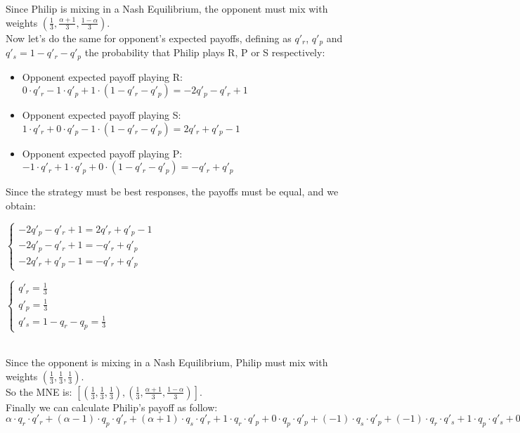 \documentclass[11pt]{article}
\begin{document}
Since Philip is mixing in a Nash Equilibrium, the opponent must mix with weights \(\left(\frac{1}{3},\frac{\alpha + 1}{3},\frac{1 - \alpha}{3}\right) \).\\
Now let's do the same for opponent's expected payoffs, defining as $q'_r$, $q'_p$ and $q'_s = 1 - q'_r - q'_p$ the probability that Philip plays R, P or S respectively:
\begin{itemize}
	\item Opponent expected payoff playing R: $0 \cdot q'_r - 1 \cdot q'_p + 1 \cdot (1 - q'_r - q'_p) = -2q'_p - q'_r + 1$
	\item Opponent expected payoff playing S: $1 \cdot q'_r + 0 \cdot q'_p - 1 \cdot (1 - q'_r - q'_p) = 2q'_r + q'_p - 1$
	\item Opponent expected payoff playing P: $-1 \cdot q'_r + 1 \cdot q'_p + 0 \cdot (1 - q'_r - q'_p) = -q'_r + q'_p$
\end{itemize}
Since the strategy must be best responses, the payoffs must be equal, and we obtain: \\
\begin{minipage}[t]{0.4\textwidth}
	\(\left \{ \begin{array}{l}
	-2q'_p - q'_r + 1 = 2q'_r + q'_p - 1 \\
	-2q'_p - q'_r + 1 = -q'_r + q'_p \\
	-2q'_r + q'_p - 1 = -q'_r + q'_p
	\end{array}
	\right. \)
\end{minipage}
\begin{minipage}[t]{0.07\textwidth}
\raisebox{-.5\height}{\scalebox{2}{$\Rightarrow$}}
\end{minipage}
\begin{minipage}[t]{0.3\textwidth}
\(\left \{ \begin{array}{l}
q'_r = \frac{1}{3} \\
q'_p = \frac{1}{3} \\
q'_s = 1 - q_r - q_p = \frac{1}{3}
\end{array}
\right. \)
\end{minipage} \\
Since the opponent is mixing in a Nash Equilibrium, Philip must mix with weights \(\left(\frac{1}{3},\frac{1}{3},\frac{1}{3}\right) \).\\
So the MNE is:
\(\left[\left(\frac{1}{3},\frac{1}{3},\frac{1}{3}\right),\left(\frac{1}{3},\frac{\alpha + 1}{3},\frac{1 - \alpha}{3}\right) \right] \).\\
Finally we can calculate Philip's payoff as follow: \\
$\alpha \cdot q_r \cdot q'_r + (\alpha - 1) \cdot q_p \cdot q'_r + (\alpha + 1) \cdot q_s \cdot q'_r + 1 \cdot q_r \cdot q'_p + 0 \cdot q_p \cdot q'_p + (-1) \cdot q_s \cdot q'_p + (-1) \cdot q_r \cdot q'_s + 1 \cdot q_p \cdot q'_s + 0 \cdot q_s \cdot q'_s = \frac{\alpha}{3}$
\end{document}
